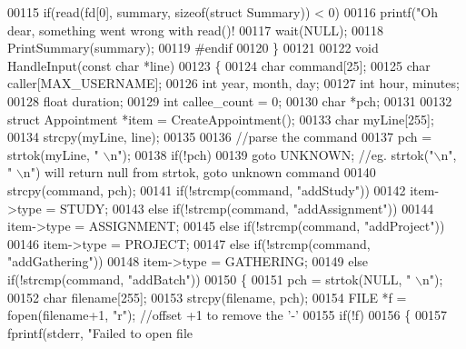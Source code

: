 \begin{DoxyCode}
{00115     \textcolor{keywordflow}{if}(read(fd[0], summary, \textcolor{keyword}{sizeof}(\textcolor{keyword}{struct} Summary)) < 0)
00116             printf(\textcolor{stringliteral}{"Oh dear, something went wrong with read()! %
00117     wait(NULL);
00118     PrintSummary(summary);
00119 \textcolor{preprocessor}{#endif}
00120 \}
00121 
00122 \textcolor{keywordtype}{void} HandleInput(\textcolor{keyword}{const} \textcolor{keywordtype}{char} *line)
00123 \{
00124     \textcolor{keywordtype}{char} command[25];
00125     \textcolor{keywordtype}{char} caller[MAX_USERNAME];
00126     \textcolor{keywordtype}{int} year, month, day;
00127     \textcolor{keywordtype}{int} hour, minutes;
00128     \textcolor{keywordtype}{float} duration;
00129     \textcolor{keywordtype}{int} callee\_count = 0;
00130     \textcolor{keywordtype}{char} *pch;
00131     
00132     \textcolor{keyword}{struct }Appointment *item = CreateAppointment();
00133     \textcolor{keywordtype}{char} myLine[255];
00134     strcpy(myLine, line);
00135 
00136     \textcolor{comment}{//parse the command}
00137     pch = strtok(myLine, \textcolor{stringliteral}{" \(\backslash\)n"});
00138     \textcolor{keywordflow}{if}(!pch)
00139         \textcolor{keywordflow}{goto} UNKNOWN;   \textcolor{comment}{//eg. strtok("\(\backslash\)n", " \(\backslash\)n") will return null from strtok, goto unknown command}
00140     strcpy(command, pch);
00141     \textcolor{keywordflow}{if}(!strcmp(command, \textcolor{stringliteral}{"addStudy"}))
00142         item->type = STUDY;
00143     \textcolor{keywordflow}{else} \textcolor{keywordflow}{if}(!strcmp(command, \textcolor{stringliteral}{"addAssignment"}))
00144         item->type = ASSIGNMENT;
00145     \textcolor{keywordflow}{else} \textcolor{keywordflow}{if}(!strcmp(command, \textcolor{stringliteral}{"addProject"}))
00146         item->type = PROJECT;
00147     \textcolor{keywordflow}{else} \textcolor{keywordflow}{if}(!strcmp(command, \textcolor{stringliteral}{"addGathering"}))
00148         item->type = GATHERING;
00149     \textcolor{keywordflow}{else} \textcolor{keywordflow}{if}(!strcmp(command, \textcolor{stringliteral}{"addBatch"}))
00150     \{
00151         pch = strtok(NULL, \textcolor{stringliteral}{" \(\backslash\)n"});
00152         \textcolor{keywordtype}{char} filename[255];
00153         strcpy(filename, pch);
00154         FILE *f = fopen(filename+1, \textcolor{stringliteral}{"r"});   \textcolor{comment}{//offset +1 to remove the '-'}
00155         \textcolor{keywordflow}{if}(!f)
00156         \{
00157             fprintf(stderr, \textcolor{stringliteral}{"Failed to open file %
}}}
\end{DoxyCode}
